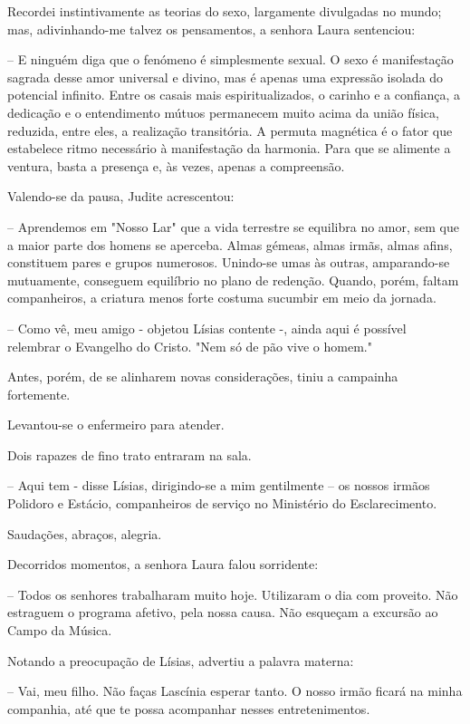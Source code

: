 \documentclass[portuguese,12pt,a4paper]{scrbook}
\begin{document}
	Recordei instintivamente as teorias do sexo, largamente divulgadas no mundo; mas, adivinhando-me talvez os pensamentos, a senhora Laura sentenciou:
	
	– E ninguém diga que o fenómeno é simplesmente sexual. O sexo é manifestação sagrada desse amor universal e divino, mas é apenas uma expressão isolada do potencial infinito. Entre os casais mais espiritualizados, o carinho e a confiança, a dedicação e o entendimento mútuos permanecem muito acima da união física, reduzida, entre eles, a realização transitória. A permuta magnética é o fator que estabelece ritmo necessário à manifestação da harmonia. Para que se alimente a ventura, basta a presença e, às vezes, apenas a compreensão.
	
	Valendo-se da pausa, Judite acrescentou:
	
	– Aprendemos em "Nosso Lar" que a vida terrestre se equilibra no amor, sem que a maior parte dos homens se aperceba. Almas gémeas, almas irmãs, almas afins, constituem pares e grupos numerosos. Unindo-se umas às outras, amparando-se mutuamente, conseguem equilíbrio no plano de redenção. Quando, porém, faltam companheiros, a criatura menos forte costuma sucumbir em meio da jornada.
	
	– Como vê, meu amigo - objetou Lísias contente -, ainda aqui é possível relembrar o Evangelho do Cristo. "Nem só de pão vive o homem."
	
	
	Antes, porém, de se alinharem novas considerações, tiniu a campainha fortemente.
	
	Levantou-se o enfermeiro para atender.
	
	Dois rapazes de fino trato entraram na sala.
	
	– Aqui tem - disse Lísias, dirigindo-se a mim gentilmente – os nossos irmãos Polidoro e Estácio, companheiros de serviço no Ministério do Esclarecimento.
	
	Saudações, abraços, alegria.
	
	Decorridos momentos, a senhora Laura falou sorridente:
	
	– Todos os senhores trabalharam muito hoje. Utilizaram o dia com proveito. Não estraguem o programa afetivo, pela nossa causa. Não esqueçam a excursão ao Campo da Música.
	
	Notando a preocupação de Lísias, advertiu a palavra materna:
	
	– Vai, meu filho. Não faças Lascínia esperar tanto. O nosso irmão ficará na minha companhia, até que te possa acompanhar nesses entretenimentos.
	
\end{document}
